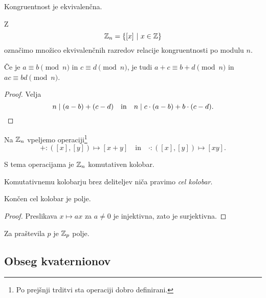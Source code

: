 \begin{trditev}
Kongruentnost je ekvivalenčna.
\end{trditev}

\obvs

\begin{definicija}
Z
\[
\mathbb{Z}_n = \left\{[x]~\middle\vert~x \in \mathbb{Z}\right\}
\]
označimo množico ekvivalenčnih razredov relacije kongruentnosti
po modulu $n$.
\end{definicija}

\begin{trditev}
Če je $a \equiv b \pmod{n}$ in $c \equiv d \pmod{n}$, je tudi
$a + c \equiv b + d \pmod{n}$ in $ac \equiv bd \pmod{n}$.
\end{trditev}

\begin{proof}
Velja
\[
n \mid (a - b) + (c - d)
\quad \text{in} \quad
n \mid c \cdot (a - b) + b \cdot (c - d). \qedhere
\]
\end{proof}

\begin{definicija}
Na $\mathbb{Z}_n$ vpeljemo operaciji\footnote{Po prejšnji trditvi sta
operaciji dobro definirani.}
\[
+ \colon ([x],[y]) \mapsto [x+y]
\quad \text{in} \quad
\cdot \colon ([x],[y]) \mapsto [xy].
\]
\end{definicija}

\begin{opomba}
S tema operacijama je $\mathbb{Z}_n$ komutativen kolobar.
\end{opomba}

\begin{definicija}
Komutativnemu kolobarju brez deliteljev niča pravimo
\emph{cel kolobar}.
\end{definicija}

\begin{lema}
Končen cel kolobar je polje.
\end{lema}

\begin{proof}
Preslikava $x \mapsto ax$ za $a \ne 0$ je injektivna, zato je
surjektivna.
\end{proof}

\begin{posledica}
Za praštevila $p$ je $\mathbb{Z}_p$ polje.
\end{posledica}

\newpage

\subsection{Obseg kvaternionov}

